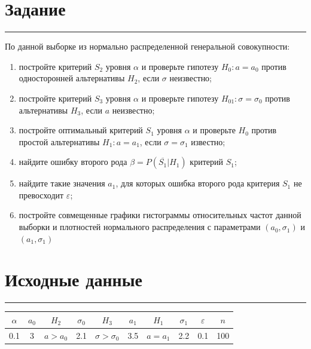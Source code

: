 \documentclass[a4paper, 14pt]{extarticle}
\begin{document}
\lstset{style=mystyle, extendedchars=\true}


\section*{Задание}\vspace{-20pt}\rule{\linewidth}{0.1mm}

По данной выборке из нормально распределенной генеральной совокупности:

\begin{enumerate}
    \item постройте критерий $S_2$ уровня $\alpha$ и проверьте гипотезу $H_0: a = a_0$ 
    против односторонней альтернативы $H_2$, если  $\sigma$ неизвестно;
    \item постройте критерий $S_3$ уровня $\alpha$ и проверьте гипотезу $H_{01}: \sigma = \sigma_0$ 
    против альтернативы $H_3$, если $a$ неизвестно;
    \item постройте оптимальный критерий $S_1$ уровня $\alpha$ и проверьте $H_0$ против простой 
    альтернативы $H_1: a = a_1$, если $\sigma = \sigma_1$ известно;
    \item найдите ошибку второго рода $\beta = P(\overline{S_1} | H_1)$ критерий $S_1$;
    \item найдите такие значения $a_1$, для которых ошибка второго рода критерия $S_1$ не 
    превосходит $\varepsilon$;
    \item постройте совмещенные графики гистограммы относительных частот данной выборки и плотностей 
    нормального распределения с параметрами $(a_0, \sigma_1)$ и $(a_1, \sigma_1)$
\end{enumerate}

\section*{Исходные данные}\vspace{-20pt}\rule{\linewidth}{0.1mm}

\vspace{10pt}

\begin{center}
    \begin{tabular}{|c|c|c|c|c|c|c|c|c|c|}
        \hline
        $\alpha$ & $a_0$ & $H_2$ & $\sigma_0$ & $H_3$ & $a_1$ & $H_1$ & $\sigma_1$ & $\varepsilon$ & $n$ \\
        \hline
        0.1 & 3 & $a > a_0$ & 2.1 & $\sigma > \sigma_0$ & 3.5 & $a = a_1$ & 2.2 & 0.1 & 100 \\
        \hline
    \end{tabular}
\end{center}
\end{document}
